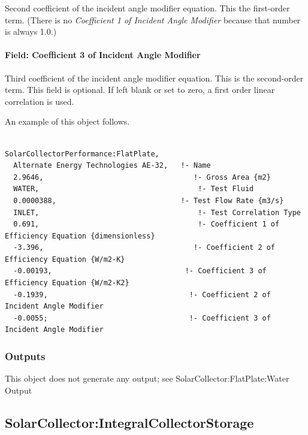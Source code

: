 Second coefficient of the incident angle modifier equation. This the first-order term. (There is no \emph{Coefficient 1 of Incident Angle Modifier} because that number is always 1.0.)

\paragraph{Field: Coefficient 3 of Incident Angle Modifier}\label{field-coefficient-3-of-incident-angle-modifier}

Third coefficient of the incident angle modifier equation. This is the second-order term. This field is optional. If left blank or set to zero, a first order linear correlation is used.

An example of this object follows.

\begin{lstlisting}

SolarCollectorPerformance:FlatPlate,
  Alternate Energy Technologies AE-32,   !- Name
  2.9646,                                   !- Gross Area {m2}
  WATER,                                     !- Test Fluid
  0.0000388,                             !- Test Flow Rate {m3/s}
  INLET,                                     !- Test Correlation Type
  0.691,                                     !- Coefficient 1 of Efficiency Equation {dimensionless}
  -3.396,                                   !- Coefficient 2 of Efficiency Equation {W/m2-K}
  -0.00193,                               !- Coefficient 3 of Efficiency Equation {W/m2-K2}
  -0.1939,                                 !- Coefficient 2 of Incident Angle Modifier
  -0.0055;                                 !- Coefficient 3 of Incident Angle Modifier
\end{lstlisting}

\subsubsection{Outputs}\label{outputs-1-025}

This object does not generate any output; see SolarCollector:FlatPlate:Water Output

\subsection{SolarCollector:IntegralCollectorStorage}\label{solarcollectorintegralcollectorstorage}

